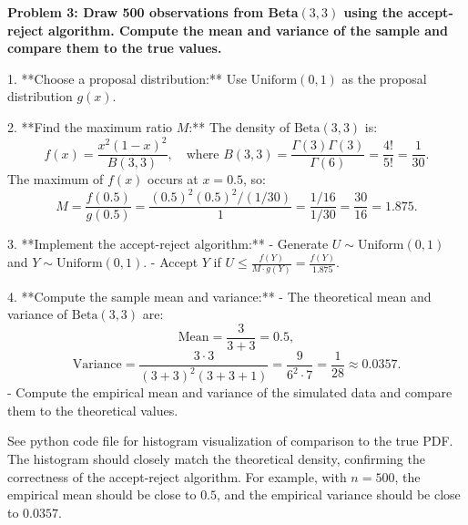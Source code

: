 \documentclass[12pt]{article}
\begin{document}
\begin{homeworkProblem}
\textbf{Problem 3: Draw 500 observations from Beta$(3,3)$ using the accept-reject algorithm. Compute the mean and variance of the sample and compare them to the true values.}

\begin{solution}

1. **Choose a proposal distribution:**
   Use \( \text{Uniform}(0,1) \) as the proposal distribution \( g(x) \).

2. **Find the maximum ratio \( M \):**
   The density of \( \text{Beta}(3,3) \) is:
   \[
   f(x) = \frac{x^{2} (1-x)^{2}}{B(3,3)}, \quad \text{where } B(3,3) = \frac{\Gamma(3)\Gamma(3)}{\Gamma(6)} = \frac{4!}{5!} = \frac{1}{30}.
   \]
   The maximum of \( f(x) \) occurs at \( x = 0.5 \), so:
   \[
   M = \frac{f(0.5)}{g(0.5)} = \frac{(0.5)^2 (0.5)^2 / (1/30)}{1} = \frac{1/16}{1/30} = \frac{30}{16} = 1.875.
   \]

3. **Implement the accept-reject algorithm:**
   - Generate \( U \sim \text{Uniform}(0,1) \) and \( Y \sim \text{Uniform}(0,1) \).
   - Accept \( Y \) if \( U \leq \frac{f(Y)}{M \cdot g(Y)} = \frac{f(Y)}{1.875} \).

4. **Compute the sample mean and variance:**
   - The theoretical mean and variance of \( \text{Beta}(3,3) \) are:
     \[
     \text{Mean} = \frac{3}{3 + 3} = 0.5,
     \]
     \[
     \text{Variance} = \frac{3 \cdot 3}{(3 + 3)^2 (3 + 3 + 1)} = \frac{9}{6^2 \cdot 7} = \frac{1}{28} \approx 0.0357.
     \]
   - Compute the empirical mean and variance of the simulated data and compare them to the theoretical values.

   See python code file for histogram visualization of comparison to the true PDF. The histogram should closely match the theoretical density, confirming the correctness of the accept-reject algorithm. For example, with \( n = 500 \), the empirical mean should be close to \( 0.5 \), and the empirical variance should be close to \( 0.0357 \).
\end{solution}
\end{homeworkProblem}
\end{document}
